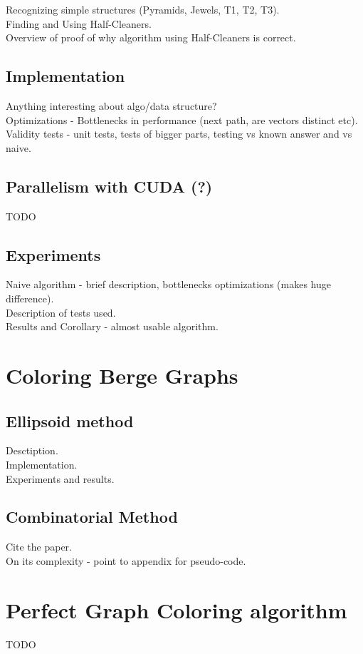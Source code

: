 \documentclass{article}
\begin{document}
Recognizing simple structures (Pyramids, Jewels, T1, T2, T3).\\

Finding and Using Half-Cleaners.\\

Overview of proof of why algorithm using Half-Cleaners is correct.\\

\subsection{Implementation}

Anything interesting about algo/data structure?\\

Optimizations - Bottlenecks in performance (next path, are vectors distinct etc).\\

Validity tests - unit tests, tests of bigger parts, testing vs known answer and vs naive.

\subsection{Parallelism with CUDA (?)}

TODO

\subsection{Experiments}

Naive algorithm - brief description, bottlenecks optimizations (makes huge difference).\\

Description of tests used.\\

Results and Corollary - almost usable algorithm.



\section{Coloring Berge Graphs}

\subsection{Ellipsoid method}

Desctiption.\\

Implementation.\\

Experiments and results.\\

\subsection{Combinatorial Method}

Cite the paper.\\

On its complexity - point to appendix for pseudo-code.

\appendix
\appendixpage
\addappheadtotoc

\section{Perfect Graph Coloring algorithm}
TODO


% 
\printbibliography
\end{document}
